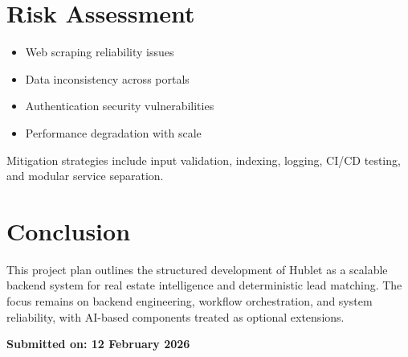\documentclass[12pt,a4paper]{article}
\begin{document}
\section*{Risk Assessment}

\begin{itemize}
    \item Web scraping reliability issues
    \item Data inconsistency across portals
    \item Authentication security vulnerabilities
    \item Performance degradation with scale
\end{itemize}

Mitigation strategies include input validation, indexing, logging, CI/CD testing, and modular service separation.

\section*{Conclusion}

This project plan outlines the structured development of Hublet as a scalable backend system for real estate intelligence and deterministic lead matching. The focus remains on backend engineering, workflow orchestration, and system reliability, with AI-based components treated as optional extensions.

\vfill
\begin{center}
\textbf{Submitted on: 12 February 2026}
\end{center}
\end{document}
